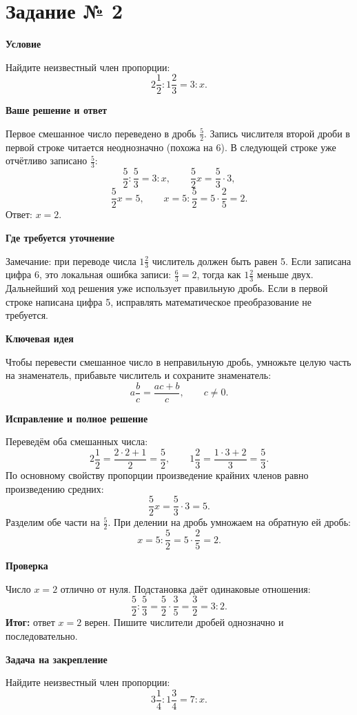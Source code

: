 \documentclass[a4paper,11pt]{article}
\newcommand{\rubric}[1]{\par\smallskip\textbf{\color{darkaccent}#1}\par\nobreak}
\begin{document}
\section*{\color{darkaccent} Задание № 2}
\setlength{\abovedisplayskip}{5pt}
\setlength{\belowdisplayskip}{5pt}
\setlength{\abovedisplayshortskip}{3pt}
\setlength{\belowdisplayshortskip}{3pt}
\rubric{Условие}
Найдите неизвестный член пропорции:
\[2\frac12:1\frac23=3:x.\]
\rubric{Ваше решение и ответ}
Первое смешанное число переведено в дробь $\frac52$. Запись числителя второй дроби в первой строке читается неоднозначно (похожа на 6). В следующей строке уже отчётливо записано $\frac53$:
\[\frac52:\frac53=3:x,\qquad \frac52 x=\frac53\cdot3,\]
\[\frac52 x=5,\qquad x=5:\frac52=5\cdot\frac25=2.\]
Ответ: $x=2$.
\rubric{Где требуется уточнение}
\textcolor{red!75!black}{Замечание:} при переводе числа $1\frac23$ числитель должен быть равен 5. Если записана цифра 6, это локальная ошибка записи: $\frac63=2$, тогда как $1\frac23$ меньше двух. Дальнейший ход решения уже использует правильную дробь. Если в первой строке написана цифра 5, исправлять математическое преобразование не требуется.
\rubric{Ключевая идея}
Чтобы перевести смешанное число в неправильную дробь, умножьте целую часть на знаменатель, прибавьте числитель и сохраните знаменатель:
\[a\frac bc=\frac{ac+b}{c},\qquad c\ne0.\]
\rubric{Исправление и полное решение}
Переведём оба смешанных числа:
\[2\frac12=\frac{2\cdot2+1}{2}=\frac52,\qquad
1\frac23=\frac{1\cdot3+2}{3}=\frac53.\]
По основному свойству пропорции произведение крайних членов равно произведению средних:
\[\frac52 x=\frac53\cdot3=5.\]
Разделим обе части на $\frac52$. При делении на дробь умножаем на обратную ей дробь:
\[x=5:\frac52=5\cdot\frac25=2.\]
\rubric{Проверка}
Число $x=2$ отлично от нуля. Подстановка даёт одинаковые отношения:
\[\frac52:\frac53=\frac52\cdot\frac35=\frac32=3:2.\]
\textcolor{accent}{\textbf{Итог:}} ответ $x=2$ верен. Пишите числители дробей однозначно и последовательно.
\rubric{Задача на закрепление}
Найдите неизвестный член пропорции:
\[3\frac14:1\frac34=7:x.\]
\clearpage
{}\label{task:6}
\end{document}
